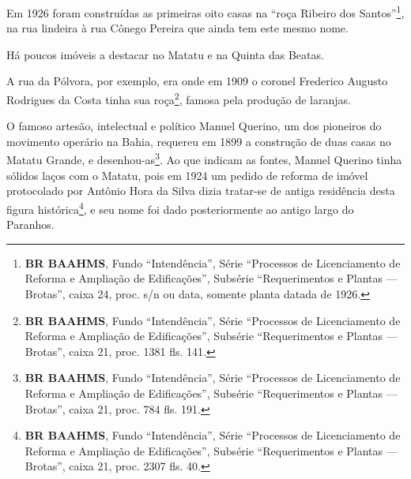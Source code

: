 



Em 1926 foram construídas as primeiras oito casas na ``roça Ribeiro dos Santos''\footnote{\textbf{BR BAAHMS}, Fundo ``Intendência'', Série ``Processos de Licenciamento de Reforma e Ampliação de Edificações'', Subsérie ``Requerimentos e Plantas --- Brotas'', caixa 24, proc. s/n ou data, somente planta datada de 1926.}, na rua lindeira à rua Cônego Pereira que ainda tem este mesmo nome.


Há poucos imóveis a destacar no Matatu e na Quinta das Beatas. 

A rua da Pólvora, por exemplo, era onde em 1909 o coronel Frederico Augusto Rodrigues da Costa tinha sua roça\footnote{\textbf{BR BAAHMS}, Fundo ``Intendência'', Série ``Processos de Licenciamento de Reforma e Ampliação de Edificações'', Subsérie ``Requerimentos e Plantas --- Brotas'', caixa 21, proc. 1381 fls. 141.}, famosa pela produção de laranjas. 














O famoso artesão, intelectual e político Manuel Querino, um dos pioneiros do movimento operário na Bahia, requereu em 1899 a construção de duas casas no Matatu Grande, e desenhou-as\footnote{\textbf{BR BAAHMS}, Fundo ``Intendência'', Série ``Processos de Licenciamento de Reforma e Ampliação de Edificações'', Subsérie ``Requerimentos e Plantas --- Brotas'', caixa 21, proc. 784 fls. 191.}. Ao que indicam as fontes, Manuel Querino tinha sólidos laços com o Matatu, pois em 1924 um pedido de reforma de imóvel protocolado por Antônio Hora da Silva dizia tratar-se de antiga residência desta figura histórica\footnote{\textbf{BR BAAHMS}, Fundo ``Intendência'', Série ``Processos de Licenciamento de Reforma e Ampliação de Edificações'', Subsérie ``Requerimentos e Plantas --- Brotas'', caixa 21, proc. 2307 fls. 40.}, e seu nome foi dado posteriormente ao antigo largo do Paranhos.

